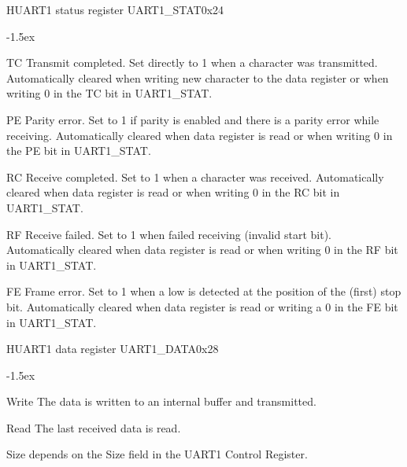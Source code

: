 \documentclass[12pt]{article}
\begin{document}
\begin{register}{H}{UART1 status register UART1\_STAT}{0x24}
\label{uart1stat}
%
%
%
%
%
\regnewline%
\end{register}
\begin{regdesc}[0.8\textwidth]\begin{reglist}[0000]
\itemsep-1.5ex
\item[TC] Transmit completed. Set directly to 1 when a character was transmitted. Automatically cleared when writing new character to the data register or when writing 0 in the TC bit in \mbox{UART1\_STAT}.
\item[PE] Parity error. Set to 1 if parity is enabled and there is a parity error while receiving. Automatically cleared when data register is read or when writing 0 in the PE bit in UART1\_STAT.
\item[RC] Receive completed. Set to 1 when a character was received. Automatically cleared when data register is read or when writing 0 in the RC bit in UART1\_STAT.
\item[RF] Receive failed. Set to 1 when failed receiving (invalid start bit). Automatically cleared when data register is read or when writing 0 in the RF bit in UART1\_STAT.
\item [FE] Frame error. Set to 1 when a low is detected at the position of the (first) stop bit. Automatically cleared when data register is read or writing a 0 in the FE bit in UART1\_STAT.
\end{reglist}\end{regdesc}

\begin{register}{H}{UART1 data register UART1\_DATA}{0x28}
\label{uart1data}
%
\regnewline%
\end{register}
\begin{regdesc}[0.6\textwidth]\begin{reglist}[000000000]
\itemsep-1.5ex
\item[Write] The data is written to an internal buffer and transmitted.
\item[Read] The last received data is read.
\end{reglist}\end{regdesc}
\hspace*{2cm}Size depends on the Size field in the UART1 Control Register.
\end{document}
